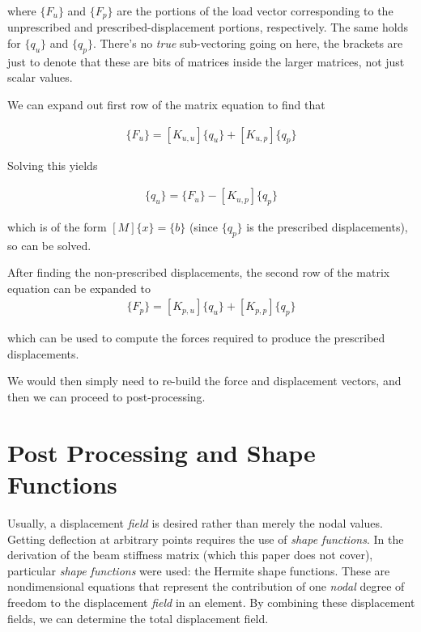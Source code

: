 \documentclass[10pt,letterpaper]{article}
\begin{document}
	where $\{F_u\}$ and $\{F_p\}$ are the portions of the load vector corresponding to the unprescribed and prescribed-displacement portions, respectively. The same holds for $\{q_u\}$ and $\{q_p\}$. There's no \textit{true} sub-vectoring going on here, the brackets are just to denote that these are bits of matrices inside the larger matrices, not just scalar values.

	We can expand out first row of the matrix equation to find that 

	\begin{align}
		\{F_u\} = [K_{u,u}] \{q_{u}\} + [K_{u,p}] \{q_{p}\}
	\end{align}

	Solving this yields

	\begin{align}
		[K_{u,u}] \{q_{u}\} = \{F_u\} - [K_{u,p}] \{q_{p}\}
	\end{align}

	which is of the form $[M] \{x\} = \{b\}$ (since $\{q_{p}\}$ is the prescribed displacements), so can be solved.

	After finding the non-prescribed displacements, the second row of the matrix equation can be expanded to
	\begin{align}
		\{F_p\} = [K_{p,u}] \{q_{u}\} + [K_{p,p}] \{q_{p}\}
	\end{align}

	which can be used to compute the forces required to produce the prescribed displacements.

	We would then simply need to re-build the force and displacement vectors, and then we can proceed to post-processing.

	\section{Post Processing and Shape Functions}

	Usually, a displacement \textit{field} is desired rather than merely the nodal values. Getting deflection at arbitrary points requires the use of \textit{shape functions}. In the derivation of the beam stiffness matrix (which this paper does not cover), particular \textit{shape functions} were used: the Hermite shape functions. These are nondimensional equations that represent the contribution of one \textit{nodal} degree of freedom to the displacement \textit{field} in an element. By combining these displacement fields, we can determine the total displacement field.
\end{document}
